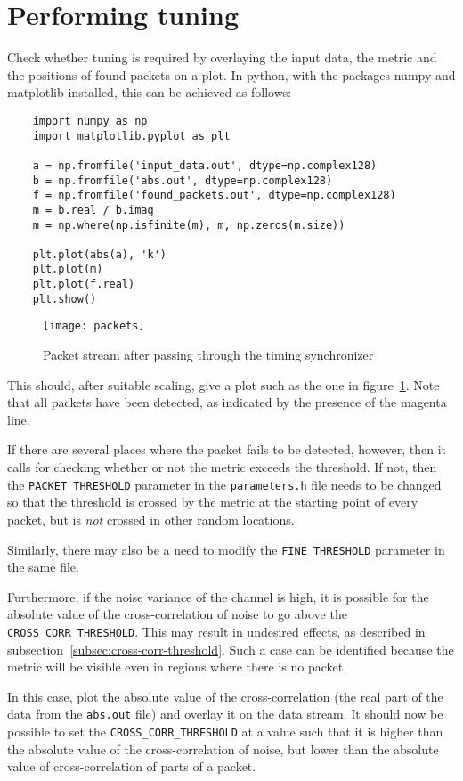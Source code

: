 
\section{Performing tuning}

Check whether tuning is required by overlaying the input data, the metric and
the positions of found packets on a plot. In python, with the packages numpy
and matplotlib installed, this can be achieved as follows:

\lstset{language=Python}
\begin{lstlisting}
	import numpy as np
	import matplotlib.pyplot as plt

	a = np.fromfile('input_data.out', dtype=np.complex128)
	b = np.fromfile('abs.out', dtype=np.complex128)
	f = np.fromfile('found_packets.out', dtype=np.complex128)
	m = b.real / b.imag
	m = np.where(np.isfinite(m), m, np.zeros(m.size))
	
	plt.plot(abs(a), 'k')
	plt.plot(m)
	plt.plot(f.real)
	plt.show()
\end{lstlisting}
\lstset{language=C++}

\begin{figure}[h]
	\centering
	\texttt{[image: packets]}
	\caption{Packet stream after passing through the timing synchronizer}
	\label{fig:packets}
\end{figure}

This should, after suitable scaling, give a plot such as the one in
figure~\ref{fig:packets}. Note that all packets have been detected, as
indicated by the presence of the magenta line.

If there are several places where the packet fails to be detected, however,
then it calls for checking whether or not the metric exceeds the threshold. If
not, then the \lstinline!PACKET_THRESHOLD! parameter in the
\texttt{parameters.h} file needs to be changed so that the threshold is crossed
by the metric at the starting point of every packet, but is \emph{not} crossed
in other random locations.

Similarly, there may also be a need to modify the \lstinline!FINE_THRESHOLD!
parameter in the same file.

Furthermore, if the noise variance of the channel is high, it is possible for
the absolute value of the cross-correlation of noise to go above the
\lstinline!CROSS_CORR_THRESHOLD!. This may result in undesired effects, as
described in subsection~\ref{subsec:cross-corr-threshold}. Such a case can be
identified because the metric will be visible even in regions where there is no
packet.

In this case, plot the absolute value of the cross-correlation (the real part
of the data from the \texttt{abs.out} file) and overlay it on the data stream.
It should now be possible to set the \lstinline!CROSS_CORR_THRESHOLD! at a
value such that it is higher than the absolute value of the cross-correlation
of noise, but lower than the absolute value of cross-correlation of parts of a
packet.
